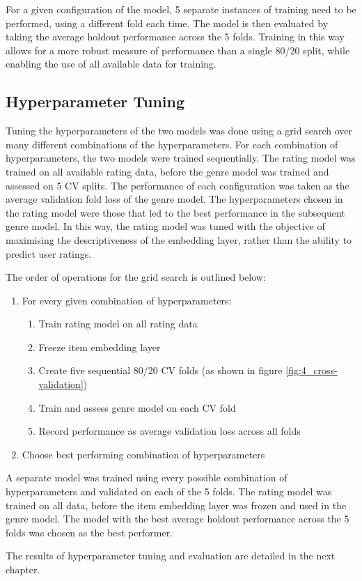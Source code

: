 For a given configuration of the model, 5 separate instances of training need to be performed, using a different fold each time. The model is then evaluated by taking the average holdout performance across the 5 folds. Training in this way allows for a more robust measure of performance than a single 80/20 split, while enabling the use of all available data for training.

\subsection{Hyperparameter Tuning}
Tuning the hyperparameters of the two models was done using a grid search over many different combinations of the hyperparameters. For each combination of hyperparameters, the two models were trained sequentially. The rating model was trained on all available rating data, before the genre model was trained and assessed on 5 CV splits. The performance of each configuration was taken as the average validation fold loss of the genre model. The hyperparameters chosen in the rating model were those that led to the best performance in the subsequent genre model. In this way, the rating model was tuned with the objective of maximising the descriptiveness of the embedding layer, rather than the ability to predict user ratings.

The order of operations for the grid search is outlined below:

\begin{enumerate}
  \item For every given combination of hyperparameters:
  \begin{enumerate}
    \item Train rating model on all rating data
    \item Freeze item embedding layer
    \item Create five sequential 80/20 CV folds (as shown in figure \ref{fig:4_cross-validation})
    \item Train and assess genre model on each CV fold
    \item Record performance as average validation loss across all folds
  \end{enumerate}
  \item Choose best performing combination of hyperparameters
\end{enumerate}

A separate model was trained using every possible combination of hyperparameters and validated on each of the 5 folds. The rating model was trained on all data, before the item embedding layer was frozen and used in the genre model. The model with the best average holdout performance across the 5 folds was chosen as the best performer.

The results of hyperparameter tuning and evaluation are detailed in the next chapter.